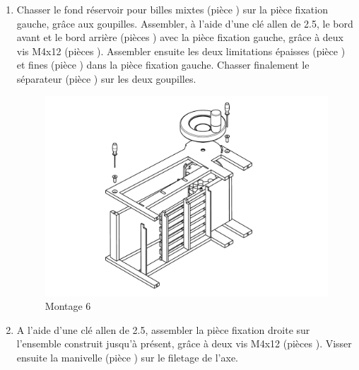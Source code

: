 \begin{enumerate}
\item Chasser le fond réservoir pour billes mixtes (pièce ) sur la pièce fixation gauche, grâce aux goupilles. Assembler, à l'aide d'une clé allen de 2.5, le bord avant et le bord arrière (pièces ) avec la pièce fixation gauche, grâce à deux vis M4x12 (pièces ). Assembler ensuite les deux limitations épaisses (pièce ) et fines (pièce ) dans la pièce fixation gauche. Chasser finalement le séparateur (pièce ) sur les deux goupilles.

\newpage

\begin{figure}
    \centering
    \centerfloat
    \includegraphics[width=1.35\textwidth]{Graphics/Montage/6.pdf}
    \caption{Montage 6}
    \label{fig:Montage6}
\end{figure}

\item A l'aide d'une clé allen de 2.5, assembler la pièce fixation droite sur l'ensemble construit jusqu'à présent, grâce à deux vis M4x12 (pièces ). Visser ensuite la manivelle (pièce ) sur le filetage de l'axe. 

\newpage


\end{enumerate}
